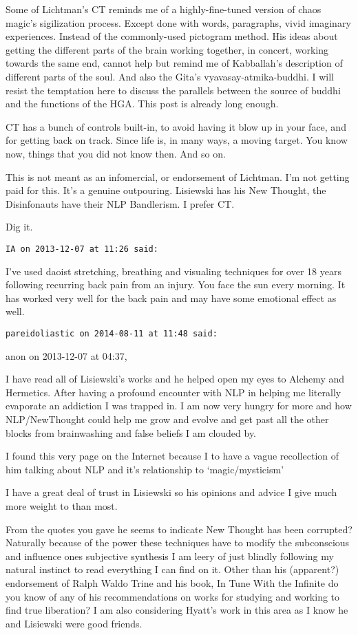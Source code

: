 \begin{footnotesize}
\begin{sffamily}
Some of Lichtman's CT reminds me of a highly-fine-tuned version of chaos magic's sigilization process. Except done with words, paragraphs, vivid imaginary experiences. Instead of the commonly-used pictogram method. His ideas about getting the different parts of the brain working together, in concert, working towards the same end, cannot help but remind me of Kabballah's description of different parts of the soul. And also the Gita's vyavasay-atmika-buddhi. I will resist the temptation here to discuss the parallels between the source of buddhi and the functions of the HGA. This post is already long enough. 

CT has a bunch of controls built-in, to avoid having it blow up in your face, and for getting back on track. Since life is, in many ways, a moving target. You know now, things that you did not know then. And so on. 

This is not meant as an infomercial, or endorsement of Lichtman. I'm not getting paid for this. It's a genuine outpouring. Lisiewski has his New Thought, the Disinfonauts have their NLP Bandlerism. I prefer CT. 

Dig it.


\hfill

\texttt{IA on 2013-12-07 at 11:26 said: }

I've used daoist stretching, breathing and visualing techniques for over 18 years following recurring back pain from an injury. You face the sun every morning. It has worked very well for the back pain and may have some emotional effect as well.


\hfill

\texttt{pareidoliastic on 2014-08-11 at 11:48 said: }

anon on 2013-12-07 at 04:37, 

I have read all of Lisiewski's works and he helped open my eyes to Alchemy and Hermetics. After having a profound encounter with NLP in helping me literally evaporate an addiction I was trapped in. I am now very hungry for more and how NLP/NewThought could help me grow and evolve and get past all the other blocks from brainwashing and false beliefs I am clouded by.

I found this very page on the Internet because I to have a vague recollection of him talking about NLP and it's relationship to `magic/mysticism'

I have a great deal of trust in Lisiewski so his opinions and advice I give much more weight to than most.

From the quotes you gave he seems to indicate New Thought has been corrupted? Naturally because of the power these techniques have to modify the subconscious and influence ones subjective synthesis I am leery of just blindly following my natural instinct to read everything I can find on it. Other than his (apparent?) endorsement of Ralph Waldo Trine and his book, In Tune With the Infinite do you know of any of his recommendations on works for studying and working to find true liberation? I am also considering Hyatt's work in this area as I know he and Lisiewski were good friends.


\end{sffamily}
\end{footnotesize}
